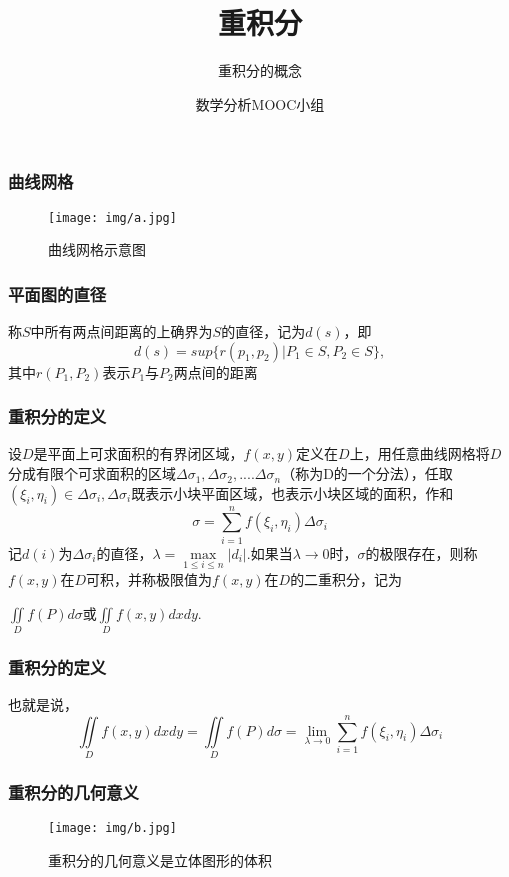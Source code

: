 \documentclass[xetex]{beamer}
\title{重积分}
\subtitle{重积分的概念}
\author{数学分析MOOC小组 }
\begin{document}
\frame{\maketitle}

\begin{frame}
    \frametitle{曲线网格}

    \begin{figure}[ht]
        \centering %
       \texttt{[image: img/a.jpg]}
         \caption{曲线网格示意图}
         \label{fig:identifier}
    \end{figure}

\end{frame}

\begin{frame}
    \frametitle{平面图的直径}
    称$S$中所有两点间距离的上确界为$S$的直径，记为$d(s)$，即
    $$d(s)=sup\{r(p_{1},p_{2}) | P_{1} \in S,P_{2} \in S\},$$
    其中$r(P_{1},P_{2})$表示$P_{1}$与$P_{2}$两点间的距离

\end{frame}

\begin{frame}
    \frametitle{重积分的定义}
    设$D$是平面上可求面积的有界闭区域，$f(x,y)$定义在$D$上，用任意曲线网格将$D$分成有限个可求面积的区域$\Delta\sigma_{1},\Delta\sigma_{2},....\Delta\sigma_{n}$（称为D的一个分法），任取$(\xi_{i},\eta_{i})\in\Delta\sigma_{i},\Delta\sigma_{i}$既表示小块平面区域，也表示小块区域的面积，作和
     $$\sigma = \sum_{i=1}^{n}{f(\xi_{i},\eta_{i})\Delta\sigma_{i}}$$
     记$d(i)$为$\Delta\sigma_{i}$的直径，$\lambda = \max\limits_{1\leq i \leq n}|d_{i}|.$如果当$\lambda\rightarrow0$时，$\sigma$的极限存在，则称$f(x,y)$在$D$可积，并称极限值为$f(x,y)$在$D$的二重积分，记为
     \begin{center}
     $\iint\limits_Df(P)d\sigma$或$\iint\limits_Df(x,y)dxdy.$
     \end{center}
\end{frame}

\begin{frame}
    \frametitle{重积分的定义}
    也就是说，
    $$\iint\limits_Df(x,y)dxdy = \iint\limits_Df(P)d\sigma = \lim\limits_{\lambda\rightarrow0}\sum_{i=1}^{n}{f(\xi_i,\eta_i)\Delta\sigma_i}$$
\end{frame}
    

\begin{frame}
    \frametitle{重积分的几何意义}
    \begin{figure}[ht]
        \centering %
       \texttt{[image: img/b.jpg]}
         \caption{重积分的几何意义是立体图形的体积}
         \label{fig:identifier}
    \end{figure}
\end{frame}
\end{document}
